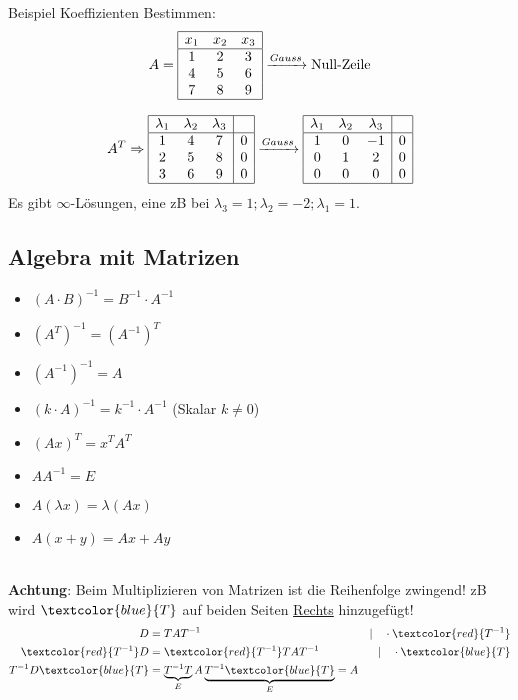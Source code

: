 \noindent Beispiel Koeffizienten Bestimmen:
\[
A = \begin{array}{|ccc|}
	\hline
	x_1 & x_2 & x_3 \\
	\hline
	1 & 2 & 3 \\
	4 & 5 & 6 \\
	7 & 8 & 9 \\
	\hline
\end{array} \xrightarrow{Gauss} \text{Null-Zeile}
\]

\[
A^T \Rightarrow
	\begin{array}{|ccc|c|}
		\hline
		\lambda_1 & \lambda_2 & \lambda_3 & \\
		\hline
		1 & 4 & 7 & 0 \\
		2 & 5 & 8 & 0 \\
		3 & 6 & 9 & 0 \\
		\hline
	\end{array}
	\xrightarrow{Gauss}
	\begin{array}{|ccc|c|}
		\hline
		\lambda_1 & \lambda_2 & \lambda_3 & \\
		\hline
		1 & 0 & -1 & 0 \\
		0 & 1 & 2 & 0 \\
		0 & 0 & 0 & 0 \\
		\hline
	\end{array}
\]
Es gibt $\infty$-Lösungen, eine zB bei $\lambda_3 = 1; \lambda_2 = -2; \lambda_1 = 1$.

\subsection{Algebra mit Matrizen}
\begin{itemize}[nosep]
	\item $(A \cdot B)^{-1} = B^{-1} \cdot A^{-1}$
	\item $(A^T)^{-1} = (A^{-1})^T$
	\item $(A^{-1})^{-1} = A$
	\item $(k \cdot A)^{-1} = k^{-1} \cdot A^{-1}$ (Skalar $k \neq 0$)
	\item $(Ax)^T = x^TA^T$
	\item $AA^{-1} = E$
	\item $A(\lambda x) = \lambda(Ax)$
	\item $A(x + y) = Ax + Ay$
\end{itemize}
~\\
\noindent\textbf{Achtung}: Beim Multiplizieren von Matrizen ist die Reihenfolge zwingend! zB wird $\textcolor{blue}{T}$ auf beiden Seiten \underline{Rechts} hinzugefügt!
\begin{align*}
	D &= TAT^{-1}  &| \quad \cdot \textcolor{red}{T^{-1}}\\
	\textcolor{red}{T^{-1}}D &= \textcolor{red}{T^{-1}}TAT^{-1}  &| \quad \cdot \textcolor{blue}{T}\\
	T^{-1}D\textcolor{blue}{T} &= \underbrace{T^{-1}T}_{E} A \underbrace{T^{-1}\textcolor{blue}{T}}_{E} = A
\end{align*}
